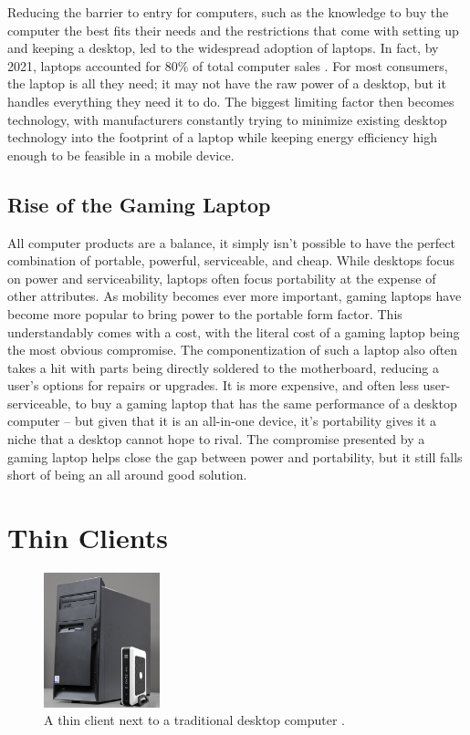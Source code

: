 Reducing the barrier to entry for computers, such as the knowledge to buy the computer the best fits their needs and the restrictions that come with setting up and keeping a desktop, led to the widespread adoption of laptops.
In fact, by 2021, laptops accounted for 80\% of total computer sales \cite{idc_2021}.
For most consumers, the laptop is all they need; it may not have the raw power of a desktop, but it handles everything they need it to do.
The biggest limiting factor then becomes technology, with manufacturers constantly trying to minimize existing desktop technology into the footprint of a laptop while keeping energy efficiency high enough to be feasible in a mobile device.


\subsection{Rise of the Gaming Laptop}\label{subsec:RiseOfTheGamingLaptop}

All computer products are a balance, it simply isn't possible to have the perfect combination of portable, powerful, serviceable, and cheap.
While desktops focus on power and serviceability, laptops often focus portability at the expense of other attributes.
As mobility becomes ever more important, gaming laptops have become more popular to bring power to the portable form factor.
This understandably comes with a cost, with the literal cost of a gaming laptop being the most obvious compromise.
The componentization of such a laptop also often takes a hit with parts being directly soldered to the motherboard, reducing a user's options for repairs or upgrades.
It is more expensive, and often less user-serviceable, to buy a gaming laptop that has the same performance of a desktop computer -- but given that it is an all-in-one device, it's portability gives it a niche that a desktop cannot hope to rival.
The compromise presented by a gaming laptop helps close the gap between power and portability, but it still falls short of being an all around good solution.


\section{Thin Clients}\label{sec:ThinClients}

\begin{figure}
  \centering
  \includegraphics[width=0.3\textwidth]{Figures/ClientronU700}
  \caption[Thin Client]{A thin client next to a traditional desktop computer \cite{ImageThinClient}.}
  \label{fig:ThinClient}
\end{figure}

